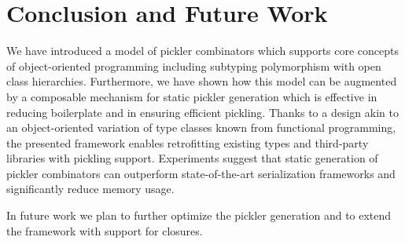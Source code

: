 \documentclass[preprint,10pt]{sigplanconf}
\theoremstyle{definition}
\theoremstyle{definition}
\begin{document}

\section{Conclusion and Future Work}

We have introduced a model of pickler combinators which supports core
concepts of object-oriented programming including subtyping polymorphism
with open class hierarchies. Furthermore, we have shown how this model
can be augmented by a composable mechanism for static pickler
generation which is effective in reducing boilerplate and in ensuring
efficient pickling. Thanks to a design akin to an object-oriented
variation of type classes known from functional programming, the
presented framework enables retrofitting existing types and
third-party libraries with pickling support. Experiments suggest that
static generation of pickler combinators can outperform
state-of-the-art serialization frameworks and significantly reduce
memory usage.

In future work we plan to further optimize the pickler generation and
to extend the framework with support for closures.













\begin{spacing}{0.9}


\end{spacing}
\end{document}
